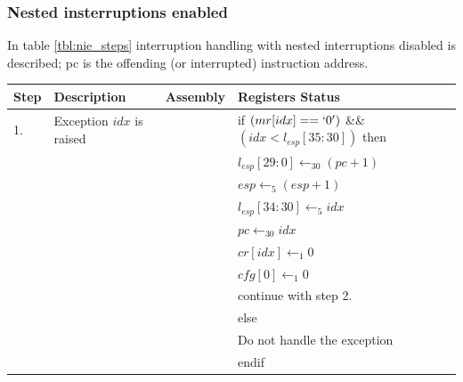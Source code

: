 \subsubsection{Nested insterruptions enabled}
\label{sssec:nested_irq_enabled}
In table \ref{tbl:nie_steps} interruption handling with nested interruptions disabled is described; pc is the offending (or interrupted) instruction address.

\begin{table}
\begin{center}
\begin{tabu} to \textwidth {|X[r]|X[2,l]|X[l]|X[2,l]|}
\rowfont[c]\bfseries
\hline
Step & Description & Assembly & Registers Status\\
\hline
{}. & Exception $idx$ is raised             &                  & if $(mr[idx]==`0')$ \&\& $(idx < l_{esp}[35:30])$ then \\
   &                                       &                  & \hspace{20pt}$l_{esp}[29:0] \leftarrow_{30} (pc + 1)$ \\
   &                                       &                  & \hspace{20pt}$esp \leftarrow_{5} (esp + 1)$ \\
   &                                       &                  & \hspace{20pt}$l_{esp}[34:30] \leftarrow_{5} idx$ \\
   &                                       &                  & \hspace{20pt}$pc \leftarrow_{30} idx$ \\
   &                                       &                  & \hspace{20pt}$cr[idx] \leftarrow_{1} 0$ \\
   &                                       &                  & \hspace{20pt}$cfg[0] \leftarrow_{1} 0$ \\
   &                                       &                  & \hspace{20pt}continue with step 2.\\
   &                                       &                  & else\\
   &                                       &                  & \hspace{20pt}Do not handle the exception \\
   &                                       &                  & endif \\

\end{tabu}
\end{center}
\end{table}
